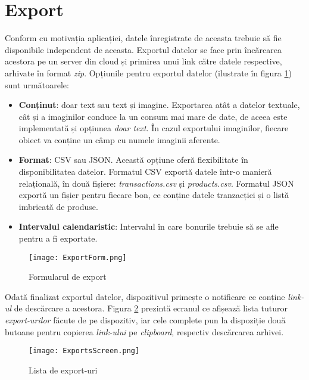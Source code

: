 \section{Export}\label{export}

Conform cu motivația aplicației, datele înregistrate de aceasta trebuie să fie disponibile independent de aceasta. Exportul datelor se face prin încărcarea acestora pe un server din cloud și primirea unui link către datele respective, arhivate în format \emph{zip}. Opțiunile pentru exportul datelor (ilustrate în figura \ref{fig:exportForm}) sunt următoarele:

\begin{itemize}
  \item
    \textbf{Conținut}: doar text sau text și imagine. Exportarea atât a datelor textuale, cât și a imaginilor conduce la un consum mai mare de date, de aceea este implementată și opțiunea \emph{doar text}. În cazul exportului imaginilor, fiecare obiect va conține un câmp cu numele imaginii aferente.
  \item
    \textbf{Format}: CSV sau JSON. Această opțiune oferă flexibilitate în disponibilitatea datelor. Formatul CSV exportă datele într-o manieră relațională, în două fișiere: \emph{transactions.csv} și \emph{products.csv}. Formatul JSON exportă un fișier pentru fiecare bon, ce conține datele tranzacției și o listă imbricată de produse.
  \item
    \textbf{Intervalul calendaristic}: Intervalul în care bonurile trebuie să se afle pentru a fi exportate.
\end{itemize}

\begin{figure}[ht]
  \centering
  \texttt{[image: ExportForm.png]}
  \caption{Formularul de export}
  \label{fig:exportForm}
\end{figure}

Odată finalizat exportul datelor, dispozitivul primește o notificare ce conține \emph{link-ul} de descărcare a acestora. Figura \ref{fig:exportsScreen} prezintă ecranul ce afișează lista tuturor \emph{export-urilor} făcute de pe dispozitiv, iar cele complete pun la dispoziție două butoane pentru copierea \emph{link-ului} pe \emph{clipboard}, respectiv descărcarea arhivei.

\begin{figure}[ht]
  \centering
  \texttt{[image: ExportsScreen.png]}
  \caption{Lista de export-uri}
  \label{fig:exportsScreen}
\end{figure}

